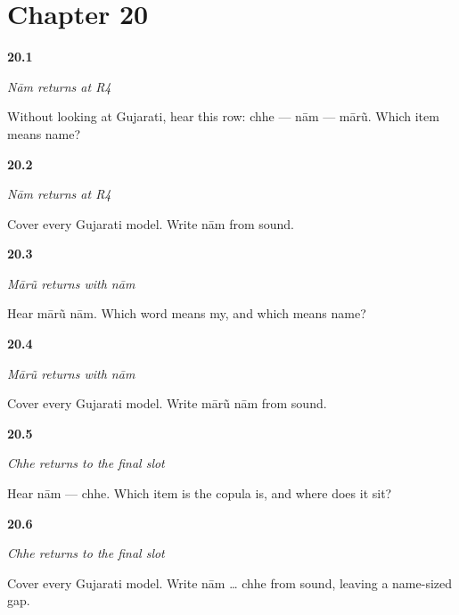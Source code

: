 \section*{Chapter 20}

\noindent\begin{minipage}[t]{\linewidth}
\raggedright
\hypertarget{review-GU-R16-naam-r4-listening}{\textbf{20.1}} \emph{Nām returns at R4}\par
\small Without looking at Gujarati, hear this row: chhe — nām — mārũ. Which item means name?
\end{minipage}\par\medskip

\noindent\begin{minipage}[t]{\linewidth}
\raggedright
\hypertarget{review-GU-R16-naam-r4-writing}{\textbf{20.2}} \emph{Nām returns at R4}\par
\small Cover every Gujarati model. Write nām from sound.
\end{minipage}\par\medskip

\noindent\begin{minipage}[t]{\linewidth}
\raggedright
\hypertarget{review-GU-R16-maarun-r4-listening}{\textbf{20.3}} \emph{Mārũ returns with nām}\par
\small Hear mārũ nām. Which word means my, and which means name?
\end{minipage}\par\medskip

\noindent\begin{minipage}[t]{\linewidth}
\raggedright
\hypertarget{review-GU-R16-maarun-r4-writing}{\textbf{20.4}} \emph{Mārũ returns with nām}\par
\small Cover every Gujarati model. Write mārũ nām from sound.
\end{minipage}\par\medskip

\noindent\begin{minipage}[t]{\linewidth}
\raggedright
\hypertarget{review-GU-R16-chhe-r4-listening}{\textbf{20.5}} \emph{Chhe returns to the final slot}\par
\small Hear nām — chhe. Which item is the copula is, and where does it sit?
\end{minipage}\par\medskip

\noindent\begin{minipage}[t]{\linewidth}
\raggedright
\hypertarget{review-GU-R16-chhe-r4-writing}{\textbf{20.6}} \emph{Chhe returns to the final slot}\par
\small Cover every Gujarati model. Write nām … chhe from sound, leaving a name-sized gap.
\end{minipage}\par\medskip

